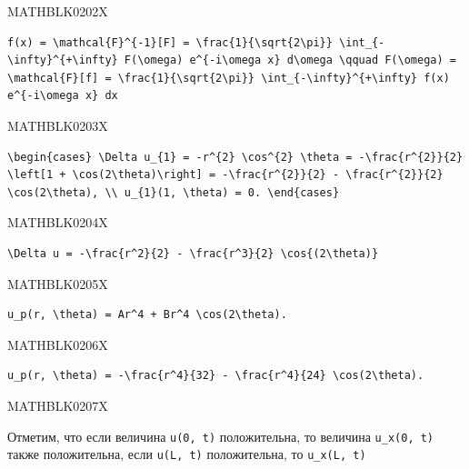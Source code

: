 \documentclass[
  ukrainian,
]{article}
\begin{document}
MATHBLK0202X

\begin{verbatim}
f(x) = \mathcal{F}^{-1}[F] = \frac{1}{\sqrt{2\pi}} \int_{-\infty}^{+\infty} F(\omega) e^{-i\omega x} d\omega \qquad F(\omega) = \mathcal{F}[f] = \frac{1}{\sqrt{2\pi}} \int_{-\infty}^{+\infty} f(x) e^{-i\omega x} dx
\end{verbatim}

MATHBLK0203X

\begin{verbatim}
\begin{cases} \Delta u_{1} = -r^{2} \cos^{2} \theta = -\frac{r^{2}}{2} \left[1 + \cos(2\theta)\right] = -\frac{r^{2}}{2} - \frac{r^{2}}{2} \cos(2\theta), \\ u_{1}(1, \theta) = 0. \end{cases}
\end{verbatim}

MATHBLK0204X

\begin{verbatim}
\Delta u = -\frac{r^2}{2} - \frac{r^3}{2} \cos{(2\theta)}
\end{verbatim}

MATHBLK0205X

\begin{verbatim}
u_p(r, \theta) = Ar^4 + Br^4 \cos(2\theta).
\end{verbatim}

MATHBLK0206X

\begin{verbatim}
u_p(r, \theta) = -\frac{r^4}{32} - \frac{r^4}{24} \cos(2\theta).
\end{verbatim}

MATHBLK0207X

Отметим, что если величина \texttt{u(0,\ t)} положительна, то величина
\texttt{u\_x(0,\ t)} также положительна, если \texttt{u(L,\ t)}
положительна, то \texttt{u\_x(L,\ t)}
\end{document}
